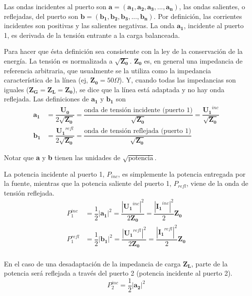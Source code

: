 Las ondas incidentes al puerto son $\textbf{a}=(\bm{a_1}, \bm{a_2}, \bm{a_3}, ..., \bm{a_n})$, las ondas salientes, o reflejadas, del puerto son $\textbf{b}=(\bm{b_1}, \bm{b_2}, \bm{b_3}, ..., \bm{b_n})$. Por definición, las corrientes incidentes son positivas y las salientes negativas. La onda $\bm{a_1}$, incidente al puerto 1, es derivada de la tensión entrante a la carga balanceada.

Para hacer que ésta definición sea consistente con la ley de la conservación de la energía. La tensión es normalizada a $\sqrt{\bm{Z_0}}$. $\bm{Z_0}$ es, en general una impedancia de referencia arbitraria, que usualmente se la utiliza como la impedancia característica de la línea (ej, $\bm{Z_0} = 50 \Omega$). Y, cuando todas las impedancias son iguales ($\bm{Z_G} = \bm{Z_L} = \bm{Z_0}$), se dice que la línea está adaptada y no hay onda reflejada. Las definiciones de $\bm{a_1}$ y $\bm{b_1}$ son
\begin{equation}
\begin{aligned}
  \bm{a_1} &= \dfrac{\bm{U_0}}{2\sqrt{\bm{Z_0}}}= \dfrac{\textrm{onda de tensión incidente (puerto 1)}}{\sqrt{\bm{Z_0}}}=\dfrac{\bm{U_1}^{inc}}{\sqrt{\bm{Z_0}}} \\
  \bm{b_1} &= \dfrac{\bm{U_1}^{refl}}{2\sqrt{\bm{Z_0}}}= \dfrac{\textrm{onda de tensión reflejada (puerto 1)}}{\sqrt{\bm{Z_0}}}
\end{aligned}
\end{equation}

Notar que \textbf{a} y \textbf{b} tienen las unidades de $\sqrt{\textrm{potencia}}$.

La potencia incidente al puerto 1, $P_{inc}$, es simplemente la potencia entregada por la fuente, mientras que la potencia saliente del puerto 1, $P_{refl}$, viene de la onda de tensión reflejada.
\begin{equation}
\begin{aligned}
  P_1^{inc} &= \dfrac{1}{2}|\bm{a_1}|^2= \dfrac{|\bm{U_1}^{inc}|^2}{2\bm{Z_0}}=\dfrac{|\bm{I_1}^{inc}|^2}{2}\bm{Z_0} \\
  P_1^{refl} &= \dfrac{1}{2}|\bm{b_1}|^2= \dfrac{|\bm{U_1}^{refl}|^2}{2\bm{Z_0}}=\dfrac{|\bm{I_1}^{refl}|^2}{2}\bm{Z_0} \\
\end{aligned}
\end{equation}

En el caso de una desadaptación de la impedancia de carga $\bm{Z_L}$, parte de la potencia será reflejada a través del puerto 2 (potencia incidente al puerto 2).
\begin{equation}
P_2^{inc}=\dfrac{1}{2}|\bm{a_2}|^2
\end{equation}

